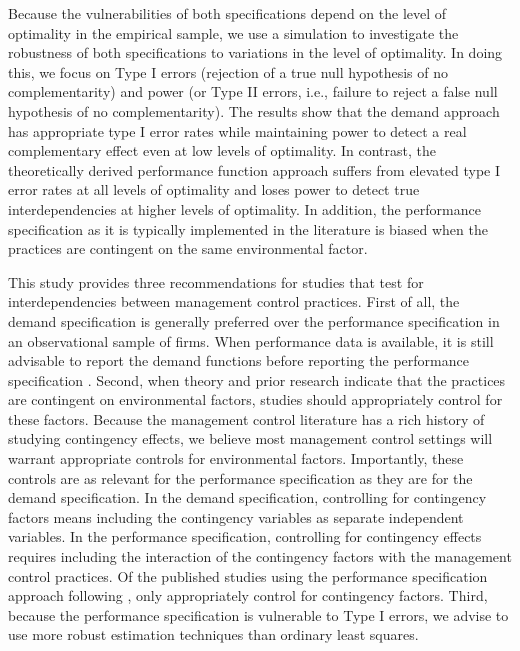 \documentclass[12pt]{article}
\begin{document}
Because the vulnerabilities of both specifications depend on the level of optimality in the empirical sample, we use a simulation to investigate the robustness of both specifications to variations in the level of optimality. In doing this, we focus on Type I errors (rejection of a true null hypothesis of no complementarity) and power (or Type II errors, i.e., failure to reject a false null hypothesis of no complementarity). The results show that the demand approach has appropriate type I error rates while maintaining power to detect a real complementary effect even at low levels of optimality. In contrast, the theoretically derived performance function approach suffers from elevated type I error rates at all levels of optimality and loses power to detect true interdependencies at higher levels of optimality. In addition, the performance specification as it is typically implemented in the literature is biased when the practices are contingent on the same environmental factor.

This study provides three recommendations for studies that test for interdependencies between management control practices. First of all, the demand specification is generally preferred over the performance specification in an observational sample of firms. When performance data is available, it is still advisable to report the demand functions before reporting the performance specification \citep{aral_three-way_2012, cassiman_search_2006}. Second, when theory and prior research indicate that the practices are contingent on environmental factors, studies should appropriately control for these factors. Because the management control literature has a rich history of studying contingency effects, we believe most management control settings will warrant appropriate controls for environmental factors. Importantly, these controls are as relevant for the performance specification as they are for the demand specification. In the demand specification, controlling for contingency factors means including the contingency variables as separate independent variables. In the performance specification, controlling for contingency effects requires including the interaction of the contingency factors with the management control practices. Of the published studies using the performance specification approach following \citet{grabner_management_2013}, only \citet{bedford_management_2016, bedford_performance_2019} appropriately control for contingency factors. Third, because the performance specification is vulnerable to Type I errors, we advise to use more robust estimation techniques than ordinary least squares.
\end{document}
